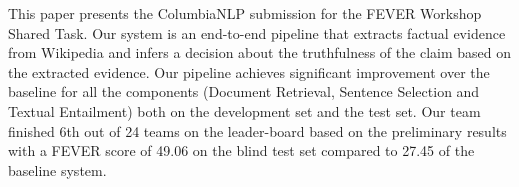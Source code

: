 This paper presents the ColumbiaNLP submission for the FEVER Workshop Shared Task. Our system is an end-to-end pipeline that extracts factual evidence from Wikipedia and infers a decision about the truthfulness of the claim based on the extracted evidence. Our pipeline achieves significant improvement over the baseline for all the components (Document Retrieval, Sentence Selection and Textual Entailment) both on the development set and the test set. Our team finished 6th out of 24 teams on the leader-board based on the preliminary results with a FEVER score of 49.06 on the blind test set compared to 27.45 of the baseline system.

